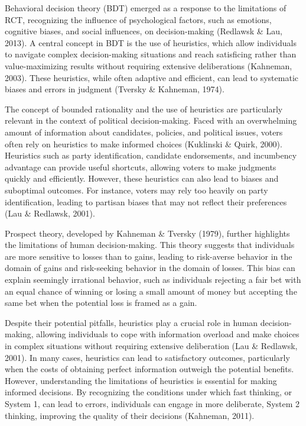 \documentclass[
]{article}
\begin{document}
Behavioral decision theory (BDT) emerged as a response to the
limitations of RCT, recognizing the influence of psychological factors,
such as emotions, cognitive biases, and social influences, on
decision-making (Redlawsk \& Lau, 2013). A central concept in BDT is the
use of heuristics, which allow individuals to navigate complex
decision-making situations and reach satisficing rather than
value-maximizing results without requiring extensive deliberations
(Kahneman, 2003). These heuristics, while often adaptive and efficient,
can lead to systematic biases and errors in judgment (Tversky \&
Kahneman, 1974).

The concept of bounded rationality and the use of heuristics are
particularly relevant in the context of political decision-making. Faced
with an overwhelming amount of information about candidates, policies,
and political issues, voters often rely on heuristics to make informed
choices (Kuklinski \& Quirk, 2000). Heuristics such as party
identification, candidate endorsements, and incumbency advantage can
provide useful shortcuts, allowing voters to make judgments quickly and
efficiently. However, these heuristics can also lead to biases and
suboptimal outcomes. For instance, voters may rely too heavily on party
identification, leading to partisan biases that may not reflect their
preferences (Lau \& Redlawsk, 2001).

Prospect theory, developed by Kahneman \& Tversky (1979), further
highlights the limitations of human decision-making. This theory
suggests that individuals are more sensitive to losses than to gains,
leading to risk-averse behavior in the domain of gains and risk-seeking
behavior in the domain of losses. This bias can explain seemingly
irrational behavior, such as individuals rejecting a fair bet with an
equal chance of winning or losing a small amount of money but accepting
the same bet when the potential loss is framed as a gain.

Despite their potential pitfalls, heuristics play a crucial role in
human decision-making, allowing individuals to cope with information
overload and make choices in complex situations without requiring
extensive deliberation (Lau \& Redlawsk, 2001). In many cases,
heuristics can lead to satisfactory outcomes, particularly when the
costs of obtaining perfect information outweigh the potential benefits.
However, understanding the limitations of heuristics is essential for
making informed decisions. By recognizing the conditions under which
fast thinking, or System 1, can lead to errors, individuals can engage
in more deliberate, System 2 thinking, improving the quality of their
decisions (Kahneman, 2011).
\end{document}

